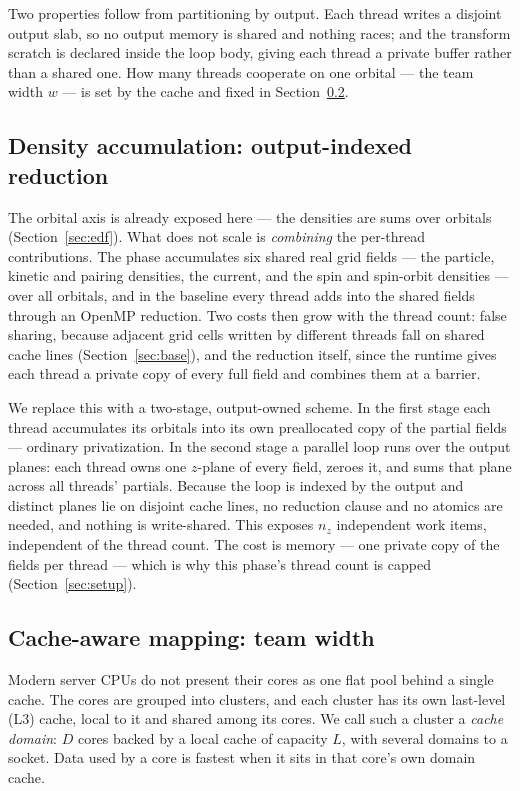 \documentclass[preprint,12pt]{elsarticle}
\numberwithin{equation}{section}
\begin{document}
Two properties follow from partitioning by output. Each thread writes a disjoint output slab, so no output memory is shared and nothing races; and the transform scratch is declared inside the loop body, giving each thread a private buffer rather than a shared one. How many threads cooperate on one orbital --- the team width $w$ --- is set by the cache and fixed in Section~\ref{sec:mapping}.

\subsection{Density accumulation: output-indexed reduction}\label{sec:dens}
The orbital axis is already exposed here --- the densities are sums over orbitals (Section~\ref{sec:edf}). What does not scale is \emph{combining} the per-thread contributions. The phase accumulates six shared real grid fields --- the particle, kinetic and pairing densities, the current, and the spin and spin-orbit densities --- over all orbitals, and in the baseline every thread adds into the shared fields through an OpenMP reduction. Two costs then grow with the thread count: false sharing, because adjacent grid cells written by different threads fall on shared cache lines (Section~\ref{sec:base}), and the reduction itself, since the runtime gives each thread a private copy of every full field and combines them at a barrier.

We replace this with a two-stage, output-owned scheme. In the first stage each thread accumulates its orbitals into its own preallocated copy of the partial fields --- ordinary privatization. In the second stage a parallel loop runs over the output planes: each thread owns one $z$-plane of every field, zeroes it, and sums that plane across all threads' partials. Because the loop is indexed by the output and distinct planes lie on disjoint cache lines, no reduction clause and no atomics are needed, and nothing is write-shared. This exposes $n_z$ independent work items, independent of the thread count. The cost is memory --- one private copy of the fields per thread --- which is why this phase's thread count is capped (Section~\ref{sec:setup}).

\subsection{Cache-aware mapping: team width}\label{sec:mapping}
Modern server CPUs do not present their cores as one flat pool behind a single cache. The cores are grouped into clusters, and each cluster has its own last-level (L3) cache, local to it and shared among its cores. We call such a cluster a \emph{cache domain}: $D$ cores backed by a local cache of capacity $L$, with several domains to a socket. Data used by a core is fastest when it sits in that core's own domain cache.
\end{document}
